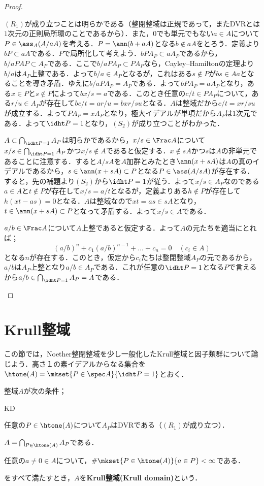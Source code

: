 \begin{proof}
	\begin{eqv}[3]
		\item $(R_1)$が成り立つことは明らかである（整閉整域は正規であって，またDVRとは$1$次元の正則局所環のことであるから）．また，$0$でも単元でもない$a\in A$について$P\in\ass_A (A/aA)$を考える．$P=\ann (b+aA)$となる$b\not\in aA$をとろう．定義より$bP\subset aA$である．$P$で局所化して考えよう．$bPA_P\subset aA_P$であるから，$b/aPAP\subset A_P$である．ここで$b/aPA_P\subset PA_P$なら，Cayley--Hamiltonの定理より$b/a$は$A_P$上整である．よって$b/a\in A_P$となるが，これはある$s\not\in P$が$bs\in Aa$となることを導き矛盾．ゆえに$b/aPA_P=A_P$である．よって$bPA_P=aA_P$となり，ある$x\in P$と$s\not\in P$によって$bx/s=a$である．このとき任意の$c/t\in PA_P$について，ある$r/u\in A_P$が存在して$bc/t=ar/u=bxr/su$となる．$A$は整域だから$c/t=xr/su$が成立する．よって$PA_P=xA_P$となり，極大イデアルが単項だから$A_P$は$1$次元である．よって$\idht P=1$となり，$(S_2)$が成り立つことがわかった．
		\item $A\subset\bigcap_{\idht P=1}A_P$は明らかであるから，$x/s\in\Frac A$について$x/s\in\bigcap_{\idht P=1} A_P$かつ$x/s\not\in A$であると仮定する．$x\not\in sA$かつ$s$は$A$の非単元であることに注意する．すると$A/sA$を$A$加群とみたとき$\ann (x+sA)$は$A$の真のイデアルであるから，$s\in\ann(x+sA)\subset P$となる$P\in\ass (A/sA)$が存在する．すると，先の補題より$(S_2)$から$\idht P=1$が従う．よって$x/s\in A_P$なのである$a\in A$と$t\not\in P$が存在して$x/s=a/t$となるが，定義よりある$h\not\in P$が存在して$h(xt-as)=0$となる．$A$は整域なので$xt=as\in sA$となり，$t\in\ann(x+sA)\subset P$となって矛盾する．よって$x/s\in A$である．
		\item $a/b\in\Frac A$について$A$上整であると仮定する．よって$A$の元たちを適当にとれば；
		\[(a/b)^n+c_1(a/b)^{n-1}+\dots+c_n=0\quad(c_i\in A)\]
		となる$n$が存在する．このとき，仮定から$c_i$たちは整閉整域$A_P$の元であるから，$a/b$は$A_P$上整となり$a/b\in A_P$である．これが任意の$\idht P=1$となる$P$で言えるから$a/b\in\bigcap_{\idht P=1}A_P=A$である．
	\end{eqv}
\end{proof}

\section{Krull整域}

この節では，Noether整閉整域を少し一般化したKrull整域と因子類群について論じよう．高さ１の素イデアルからなる集合を$\htone(A)=\mkset{P\in\spec A}{\idht P=1}$とおく．
\begin{defi}[Krull整域]
	整域$A$が次の条件；
	\begin{defiterm}{KD}
		\item 任意の$P\in\htone(A)$について$A_P$はDVRである（$(R_1)$が成り立つ）．
		\item $A=\bigcap_{P\in\htone(A)}A_P$である．
		\item 任意の$a\neq 0\in A$について，$\#\mkset{P\in\htone(A)}{a\in P}<\infty$である．
	\end{defiterm}
	をすべて満たすとき，$A$を\textbf{Krull整域(Krull domain)}という．
\end{defi}

